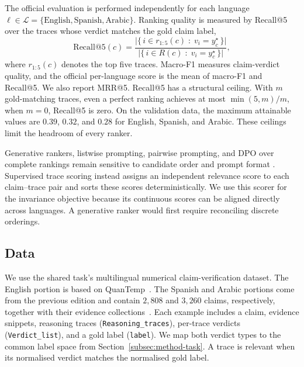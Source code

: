 The official evaluation is performed independently for each language
$\ell\in\mathcal{L}=\{\text{English},\text{Spanish},\text{Arabic}\}$. Ranking quality is measured by
Recall@5 over the traces whose verdict matches the gold claim label,
\begin{equation}
\label{eq:recall5}
\mathrm{Recall@5}(c)=
\frac{\bigl|\{\,i\in r_{1:5}(c)\;:\;v_i=y^\star_c\,\}\bigr|}
     {\bigl|\{\,i\in R(c)\;:\;v_i=y^\star_c\,\}\bigr|},
\end{equation}
where $r_{1:5}(c)$ denotes the top five traces. Macro-F1 measures claim-verdict quality, and the
official per-language score is the mean of macro-F1 and Recall@5. We also report MRR@5. Recall@5 has
a structural ceiling. With $m$ gold-matching traces, even a perfect ranking achieves at most
$\min(5,m)/m$, when $m=0$, Recall@5 is zero. On the validation data, the maximum attainable values are
$0.39$, $0.32$, and $0.28$ for English, Spanish, and Arabic. These ceilings limit the headroom of
every ranker.

Generative rankers, listwise prompting, pairwise prompting, and DPO over complete rankings remain
sensitive to candidate order and prompt format
\cite{qin2024largelanguagemodelseffective,shi2025judgingjudgessystematicstudy,rafailov2024directpreferenceoptimizationlanguage,qiao2026llmbasedlistwisererankingeffect,fu2025reliablemultilingualllmasajudge}.
Supervised trace scoring instead assigns an independent relevance score to each claim--trace pair and
sorts these scores deterministically. We use this scorer for the invariance objective because its
continuous scores can be aligned directly across languages. A generative ranker would first require
reconciling discrete orderings.

\subsection{Data}
\label{subsec:method-data}

We use the shared task's multilingual numerical claim-verification dataset. The English portion is
based on QuanTemp~\cite{v2024quantemprealworldopendomainbenchmark}. The Spanish and Arabic portions
come from the previous edition and contain $2{,}808$ and $3{,}260$ claims, respectively, together with
their evidence collections~\cite{clef-checkthat:2026:task2}. Each example includes a claim, evidence
snippets, reasoning traces (\texttt{Reasoning\_traces}), per-trace verdicts
(\texttt{Verdict\_list}), and a gold label (\texttt{label}). We map both verdict types to the common
label space from Section~\ref{subsec:method-task}. A trace is relevant when its normalised verdict
matches the normalised gold label.

